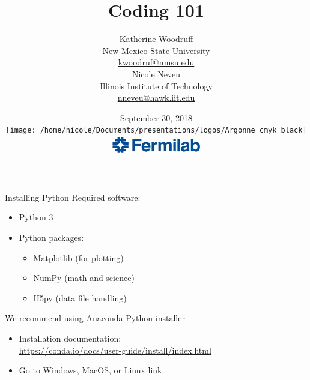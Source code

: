 \documentclass[xcolor=dvipsnames, professionalfonts,t]{beamer}
\title[September 2018]{\vspace{-1em}Coding 101 }
\author[K. Woodruff and N.Neveu]{{\Large{Katherine Woodruff} \\ \small{New Mexico State University} \\
		\url{kwoodruf@nmsu.edu} \\ \vspace{1em} \Large{Nicole Neveu} \\ \small{Illinois Institute of Technology}   \\ \url{nneveu@hawk.iit.edu}    }} \vspace{-5em}
\institute[] %
{   
	  
}
\date{ September 30, 2018 \\
	\texttt{[image: /home/nicole/Documents/presentations/logos/Argonne\_cmyk\_black]}%
	\hfill \hfill \hfill%
	\includegraphics[width=4cm,keepaspectratio]{FNAL}%
}
\begin{document}

\begin{frame}
\titlepage
\end{frame}
\begin{frame}{Installing Python}
  Required software:
  \begin{itemize}
    \item Python 3
    \item Python packages:
    \begin{itemize}
      \item Matplotlib (for plotting)
      \item NumPy (math and science)
      \item H5py (data file handling)
    \end{itemize}
  \end{itemize}
  We recommend using Anaconda Python installer
  \begin{itemize}
    \item Installation documentation: \\
    \url{https://conda.io/docs/user-guide/install/index.html}
    \item Go to Windows, MacOS, or Linux link
  \end{itemize}
\end{frame}
\end{document}

